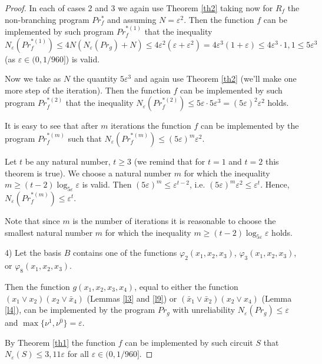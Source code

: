 \documentclass[
11pt,%
tightenlines,%
twoside,%
onecolumn,%
nofloats,%
nobibnotes,%
nofootinbib,%
superscriptaddress,%
noshowpacs,%
centertags]%
{revtex4}
\begin{document}
\begin{proof}
In each of cases 2 and 3 we again use Theorem \ref{th2} taking now
for $R_f$ the non-branching program $Pr_f^*$ and assuming $N =
\varepsilon^2$. Then the function $f$ can be implemented by such
program $Pr_f^{*(1)}$ that the inequality
$N_\varepsilon(Pr_f^{*(1)})\leq 4N (N_\varepsilon(Pr_g) + N) \leq 4
\varepsilon^2 (\varepsilon + \varepsilon^2) = 4 \varepsilon^3 (1+
\varepsilon) \leq 4 \varepsilon^3\cdot 1,1 \leq 5 \varepsilon^3$
\linebreak (as $\varepsilon\in(0, 1/960]$) is valid.

Now we take as $N$ the quantity $5\varepsilon^3$ and again use
Theorem \ref{th2} (we'll make one more step of the iteration). Then
the function $f$ can be implemented by such program $Pr_f^{*(2)}$
that the inequality
$N_\varepsilon(Pr_f^{*(2)})\leq5\varepsilon\cdot5\varepsilon^3=(5\varepsilon)^2\varepsilon^2$
holds.

It is easy to see that after $m$ iterations the function $f$ can be
implemented by the program $Pr_f^{*(m)}$ such that
$N_\varepsilon(Pr_f^{*(m)})\leq(5\varepsilon)^m\varepsilon^2$.

Let $t$ be any natural number, $t\geq 3$ (we remind that for $t = 1$
and $t = 2$  this theorem is true). We choose a natural number $m$
for which the inequality $m\geq(t-2)\log_{5\varepsilon}\varepsilon$
is valid. Then $(5\varepsilon)^m \leq \varepsilon^{t-2}$, i.e.
$(5\varepsilon)^m\varepsilon^2 \leq \varepsilon^{t}$. Hence,
$N_\varepsilon(Pr_f^{*(m)})\leq\varepsilon^t$.

Note that since $m$ is the number of iterations it is reasonable to
choose the  smallest natural number $m$ for which the inequality
$m\geq(t-2)\log_{5\varepsilon}\varepsilon$ holds.

4) Let the basis $B$ contains one of the functions  $\varphi_2(x_1,
x_2, x_3)$, $\varphi_3(x_1, x_2, x_3)$, or $\varphi_8(x_1, x_2,
x_3)$.

Then the function $g (x_1, x_2, x_3, x_4)$, equal to either  the
function $(x_1\vee x_2)(x_2\vee\bar{x}_4)$ (Lemmas \ref{l3} and
\ref{l9}) or $(\bar{x}_1\vee \bar{x}_2)(x_2\vee x_4)$ (Lemma
\ref{l4}), can be implemented by the program $Pr_g$ with
unreliability $N_\varepsilon(Pr_g) \leq \varepsilon$ and
$\max\{\nu^1, \nu^0\}=\varepsilon$.

By Theorem \ref{th1} the function $f$ can be implemented by  such
circuit $S$ that $N_\varepsilon(S) \leq3,11\varepsilon$ \linebreak
for all $\varepsilon\in(0, 1/960]$.


\end{proof}
\end{document}
